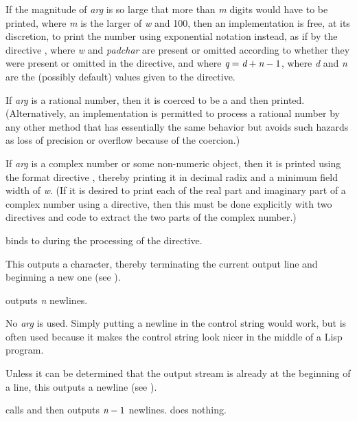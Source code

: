 \begin{flushdesc}
If the magnitude of \emph{arg} is so large that more than \emph{m} digits would
have to be printed, where \emph{m} is the larger of \emph{w} and 100, then an
implementation is free, at its discretion, to print the number using
exponential notation instead, as if by the directive
, where \emph{w} and \emph{padchar} are
present or omitted according to whether they were present or omitted in
the \cd{{\Xtilde}\$} directive, and where $\emph{q}=\emph{d}+\emph{n}-1$,
where \emph{d} and \emph{n} are the (possibly default) values given to the
\cd{{\Xtilde}\$} directive.

If \emph{arg} is a rational number, then it is coerced to be a 
and then printed.  (Alternatively, an implementation is permitted to
process a rational number by any other method that has essentially the
same behavior but avoids such hazards as loss of precision or overflow
because of the coercion.)

If \emph{arg} is a complex number or some non-numeric
object, then it is printed using the format directive ,
thereby printing it in decimal radix and a minimum field width of \emph{w}.
(If it is desired to print each of the real part and imaginary part
of a complex number using a \cd{{\Xtilde}\$} directive, then this must
be done explicitly with two \cd{{\Xtilde}\$} directives and code to
extract the two parts of the complex number.)

 binds  to 
during the processing of the \cd{{\Xtilde}\$} directive.

\item[\cd{{\Xtilde}\%}]
This outputs a  character, thereby terminating the current
output line and beginning a new one
(see ).

 outputs \emph{n} newlines.

No \emph{arg} is used.  Simply putting a newline in the control string
would work, but \cd{{\Xtilde}\%} is often used because it makes the control string
look nicer in the middle of a Lisp program.

\item[\cd{{\Xtilde}\&}]
Unless it can be determined that the output stream
is already at the beginning of a line,
this outputs a newline (see ).

 calls 
and then outputs $\emph{n}-1$ newlines.
 does nothing.


\end{flushdesc}
